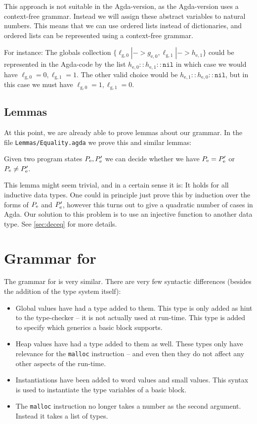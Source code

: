 This approach is not suitable in the Agda-version, as the Agda-version uses a
context-free grammar. Instead we will assign these abstract variables to natural
numbers. This means that we can use ordered lists instead of dictionaries, and
ordered lists can be represented using a context-free grammar.

For instance: The globals collection
$\{\ell_{\mathrm{g},0} |-> g_{\mathrm{e},0}, \ell_{\mathrm{g},1} |->
h_{\mathrm{e},1}\}$ could be represented in the Agda-code by the list
$h_{\mathrm{e},0} :: h_{\mathrm{e},1} :: \mathtt{nil}$ in which case we would
have $\ell_{\mathrm{g},0} = 0, \ell_{\mathrm{g},1} = 1$. The other valid choice
would be $h_{\mathrm{e},1} :: h_{\mathrm{e},0} :: \mathtt{nil}$, but in this
case we must have $\ell_{\mathrm{g},0} = 1, \ell_{\mathrm{g},1} = 0$.

\subsection{Lemmas}

At this point, we are already able to prove lemmas about our grammar. In the
file \texttt{Lemmas/Equality.agda} we prove this and similar lemmas:

\begin{lemma} Given two program states $P_{\mathrm{e}}, P'_{\mathrm{e}}$ we can decide
  whether we have $P_{\mathrm{e}} = P'_{\mathrm{e}}$ or $P_{\mathrm{e}} \neq P'_{\mathrm{e}}$.
\end{lemma}

This lemma might seem trivial, and in a certain sense it is: It holds for all
inductive data types. One could in principle just prove this by induction over
the forms of $P_{\mathrm{e}}$ and $P'_{\mathrm{e}}$, however this turns out to give a
quadratic number of cases in Agda. Our solution to this problem is to use an
injective function to another data type. See \cref{sec:deceq} for more details.

\section{Grammar for \ATAL}

The grammar for \ATAL is very similar. There are very few syntactic
differences (besides the addition of the type system itself):

\begin{itemize}
\item Global values have had a type added to them. This type is only added as
  hint to the type-checker -- it is not actually used at run-time. This type is
  added to specify which generics a basic block supports.
\item Heap values have had a type added to them as well. These types only have
  relevance for the \texttt{malloc} instruction -- and even then they do not
  affect any other aspects of the run-time.
\item Instantiations have been added to word values and small values. This
  syntax is used to instantiate the type variables of a basic block.
\item The \texttt{malloc} instruction no longer takes a number as the second
  argument. Instead it takes a list of types.
\end{itemize}

